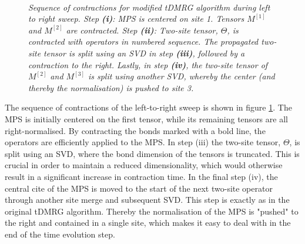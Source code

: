 \begin{figure}[h!]
\centering %
\begin{subfigure}[b]{0.4\textwidth}
	\caption{}  
  	
\end{subfigure}
\hspace{10mm}
\begin{subfigure}[b]{0.4\textwidth}
	\caption{}    
  	
\end{subfigure}
\\ %
\vspace{5mm}
\begin{subfigure}[b]{0.4\textwidth}
	\caption{}    	
  	
\end{subfigure}
\hspace{10mm}
\begin{subfigure}[b]{0.4\textwidth}
	\caption{}  
  	
\end{subfigure}
\caption{\textit{Sequence of contractions for modified tDMRG algorithm during left to right sweep. Step \textbf{(i)}: MPS is centered on site 1. Tensors $M^{[1]}$ and $M^{[2]}$ are contracted. Step \textbf{(ii)}: Two-site tensor, $\Theta$, is contracted with operators in numbered sequence. The propagated two-site tensor is split using an SVD in step \textbf{(iii)}, followed by a contraction to the right. Lastly, in step \textbf{(iv)}, the two-site tensor of $M^{[2]}$ and $M^{[3]}$ is split using another SVD, whereby the center (and thereby the normalisation) is pushed to site 3.}}
\label{fig:TEBDContraction}
\end{figure}
The sequence of contractions of the left-to-right sweep is shown in figure \ref{fig:TEBDContraction}. The MPS is initially centered on the first tensor, while its remaining tensors are all right-normalised. By contracting the bonds marked with a bold line, the operators are efficiently applied to the MPS. In step (iii) the two-site tensor, $\Theta$, is split using an SVD, where the bond dimension of the tensors is truncated. This is crucial in order to maintain a reduced dimensionality, which would otherwise result in a significant increase in contraction time. In the final step (iv), the central cite of the MPS is moved to the start of the next two-site operator through another site merge and subsequent SVD. This step is exactly as in the original tDMRG algorithm. Thereby the normalisation of the MPS is "pushed" to the right and contained in a single site, which makes it easy to deal with in the end of the time evolution step.\\
